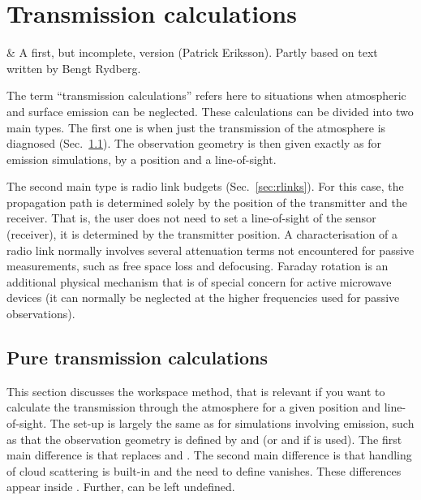\chapter{Transmission calculations}
 \label{sec:trans}

 & A first, but incomplete, version (Patrick Eriksson). Partly based on
 text written by Bengt Rydberg.\\
\stophistory

\graphicspath{{Figs/transmission/}}

The term ``transmission calculations'' refers here to situations when
atmospheric and surface emission can be neglected. These calculations can be
divided into two main types. The first one is when just the transmission of the
atmosphere is diagnosed (Sec.~\ref{sec:transmission}). The observation geometry
is then given exactly as for emission simulations, by a position and a
line-of-sight.

The second main type is radio link budgets (Sec.~\ref{sec:rlinks}). For
this case, the propagation path is determined solely by the position of the
transmitter and the receiver. That is, the user does not need to set a
line-of-sight of the sensor (receiver), it is determined by the transmitter
position. A characterisation of a radio link normally involves several
attenuation terms not encountered for passive measurements, such as free space
loss and defocusing. Faraday rotation is an additional physical mechanism that
is of special concern for active microwave devices (it can normally be
neglected at the higher frequencies used for passive observations).




\section{Pure transmission calculations}
\label{sec:transmission}

This section discusses the  workspace method,
that is relevant if you want to calculate the transmission through the
atmosphere for a given position and line-of-sight. The set-up is largely the
same as for simulations involving emission, such as that the observation
geometry is defined by  and  (or
 and  if  is used).
The first main difference is that  replaces
 and . The second
main difference is that handling of cloud scattering is built-in and the need
to define  vanishes. These differences appear
inside . Further,
 can be left undefined.

